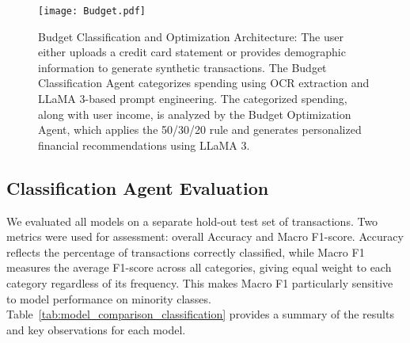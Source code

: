 \documentclass[conference]{IEEEtran}
\begin{document}
\begin{figure*}[htbp]
\centering
\texttt{[image: Budget.pdf]}
\caption{Budget Classification and Optimization Architecture: The user either uploads a credit card statement or provides demographic information to generate synthetic transactions. The Budget Classification Agent categorizes spending using OCR extraction and LLaMA 3-based prompt engineering. The categorized spending, along with user income, is analyzed by the Budget Optimization Agent, which applies the 50/30/20 rule and generates personalized financial recommendations using LLaMA 3.}
\label{fig:budget_flowchart}
\end{figure*}

\subsection{Classification Agent Evaluation}
We evaluated all models on a separate hold-out test set of transactions. Two metrics were used for assessment: overall Accuracy and Macro F1-score. Accuracy reflects the percentage of transactions correctly classified, while Macro F1 measures the average F1-score across all categories, giving equal weight to each category regardless of its frequency. This makes Macro F1 particularly sensitive to model performance on minority classes. Table~\ref{tab:model_comparison_classification} provides a summary of the results and key observations for each model.


\begin{table*}[htbp]
  \centering
  \caption{Model Comparison for Budget Classification}
  \label{tab:model_comparison_classification}
\end{table*}
\end{document}
